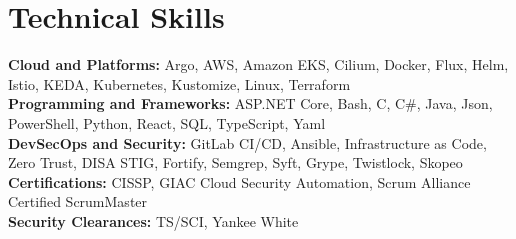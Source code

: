 \section{Technical Skills}
\textbf{Cloud and Platforms:} Argo, AWS, Amazon EKS, Cilium, Docker, Flux, Helm, Istio, KEDA, Kubernetes, Kustomize, Linux, Terraform\\
\textbf{Programming and Frameworks:} ASP.NET Core, Bash, C, C\#, Java, Json, PowerShell, Python, React, SQL, TypeScript, Yaml\\
\textbf{DevSecOps and Security:} GitLab CI/CD, Ansible, Infrastructure as Code, Zero Trust, DISA STIG, Fortify, Semgrep, Syft, Grype, Twistlock, Skopeo\\
\textbf{Certifications:} CISSP, GIAC Cloud Security Automation, Scrum Alliance Certified ScrumMaster\\
\textbf{Security Clearances:} TS/SCI, Yankee White
